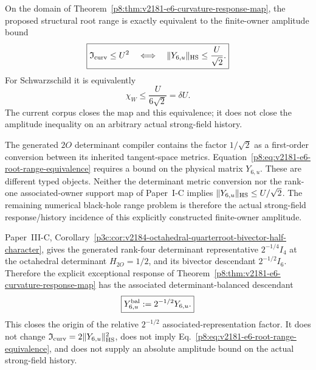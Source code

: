 \documentclass[12pt,a4paper]{article}
\begin{document}
\begin{corollary}
\label{p8:cor:v2181-e6-root-range-equivalence}
On the domain of
Theorem~\ref{p8:thm:v2181-e6-curvature-response-map}, the proposed structural
root range is exactly equivalent to the finite-owner amplitude bound
\begin{equation}
\label{p8:eq:v2181-e6-root-range-equivalence}
 \boxed{
 \mathfrak I_{\rm curv}\le U^2
 \quad\Longleftrightarrow\quad
 \|Y_{6,u}\|_{\rm HS}\le\frac{U}{\sqrt2}.}
\end{equation}
For Schwarzschild it is equivalently
\[
 \chi_W\le\frac{U}{6\sqrt2}=\delta U.
\]
The current corpus closes the map and this equivalence; it does not close the
amplitude inequality on an arbitrary actual strong-field history.
\end{corollary}

\begin{remark}
\label{p8:rem:v2181-e6-amplitude-firewall}
The generated \(2O\) determinant compiler contains the factor
\(1/\sqrt2\) as a first-order conversion between its inherited tangent-space
metrics.  Equation~\eqref{p8:eq:v2181-e6-root-range-equivalence} requires a
bound on the physical matrix \(Y_{6,u}\).  These are different typed objects.
Neither the determinant metric conversion nor the rank-one associated-owner
support map of Paper~I-C implies
\(\|Y_{6,u}\|_{\rm HS}\le U/\sqrt2\).  The remaining numerical black-hole
range problem is therefore the actual strong-field response/history incidence
of this explicitly constructed finite-owner amplitude.
\end{remark}

\begin{corollary}
\label{p8:cor:v2184-octahedral-determinant-balanced-e6-response}
Paper~III-C,
Corollary~\ref{p3c:cor:v2184-octahedral-quarterroot-bivector-half-character},
gives the generated rank-four determinant representative
\(2^{-1/4}I_4\) at the octahedral determinant \(H_{2O}=1/2\), and its
bivector descendant \(2^{-1/2}I_6\).  Therefore the explicit exceptional
response of Theorem~\ref{p8:thm:v2181-e6-curvature-response-map} has the
associated determinant-balanced descendant
\begin{equation}
\label{p8:eq:v2184-e6-determinant-balanced-descendant}
 \boxed{Y_{6,u}^{\rm bal}:=2^{-1/2}Y_{6,u}.}
\end{equation}
This closes the origin of the relative \(2^{-1/2}\) associated-representation
factor.  It does not change
\(\mathfrak I_{\rm curv}=2\|Y_{6,u}\|_{\rm HS}^2\), does not imply
Eq.~\eqref{p8:eq:v2181-e6-root-range-equivalence}, and does not supply an
absolute amplitude bound on the actual strong-field history.
\end{corollary}
\end{document}
